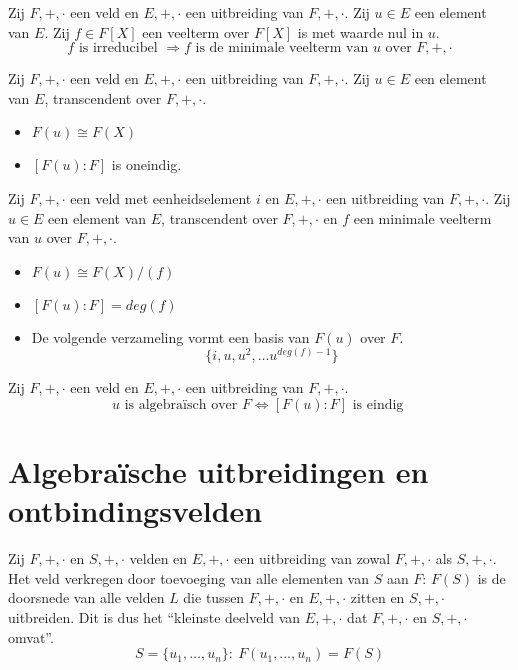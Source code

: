 \documentclass[main.tex]{subfiles}
\begin{document}
\begin{ei}
  Zij $F,+,\cdot$ een veld en $E,+,\cdot$ een uitbreiding van $F,+,\cdot$.
  Zij $u\in E$ een element van $E$.
  Zij $f\in F[X]$ een veelterm over $F[X]$ is met waarde nul in $u$.
  \[ f \text{ is irreducibel } \Rightarrow f \text{ is de minimale veelterm van } u \text{ over } F,+,\cdot \]
\end{ei}

\begin{st}
  Zij $F,+,\cdot$ een veld en $E,+,\cdot$ een uitbreiding van $F,+,\cdot$.
  Zij $u\in E$ een element van $E$, transcendent over $F,+,\cdot$.
  \begin{itemize}
  \item $F(u) \cong F(X)$
  \item $[F(u):F]$ is oneindig.
  \end{itemize}
\end{st}

\begin{st}
  Zij $F,+,\cdot$ een veld met eenheidselement $i$ en $E,+,\cdot$ een uitbreiding van $F,+,\cdot$.
  Zij $u\in E$ een element van $E$, transcendent over $F,+,\cdot$ en $f$ een minimale veelterm van $u$ over $F,+,\cdot$.
  \begin{itemize}
  \item $F(u) \cong F(X)/(f)$
  \item $[F(u):F] = deg(f)$
  \item De volgende verzameling vormt een basis van $F(u)$ over $F$.
  \[ \{ i,u,u^{2},\dotsc u^{deg(f)-1} \}\]
  \end{itemize}
\end{st}

\begin{gev}
  Zij $F,+,\cdot$ een veld en $E,+,\cdot$ een uitbreiding van $F,+,\cdot$.
  \[ u \text{ is algebra\"isch over } F \Leftrightarrow [F(u):F] \text{ is eindig } \]
\end{gev}

\section{Algebra\"ische uitbreidingen en ontbindingsvelden}
\label{sec:algebr-uitbr-en}

\begin{de}
  Zij $F,+,\cdot$ en $S,+,\cdot$ velden en $E,+,\cdot$ een uitbreiding van zowal $F,+,\cdot$ als $S,+,\cdot$.
  Het veld verkregen door toevoeging van alle elementen van $S$ aan $F$: $F(S)$ is de doorsnede van alle velden $L$ die tussen $F,+,\cdot$ en $E,+,\cdot$ zitten en $S,+,\cdot$ uitbreiden.
  Dit is dus het ``kleinste deelveld van $E,+,\cdot$ dat $F,+,\cdot$ en $S,+,\cdot$ omvat''.
  \[ S = \{ u_{1},\dotsc,u_{n} \}:\ F(u_{1},\dotsc,u_{n}) = F(S) \]
\end{de}
\end{document}
